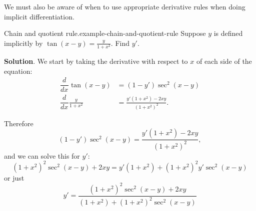 \documentclass[10pt,]{book}
\numberwithin{equation}{section}
\newcommand{\dv}[3][]{\dfrac{d^{#1} #2}{d #3^{#1}}}
\begin{document}
\hypertarget{p-163}{}%
We must also be aware of when to use appropriate derivative rules when doing implicit differentiation.%
\begin{example}{Chain and quotient rule.}{example-chain-and-quotient-rule}%
\hypertarget{p-164}{}%
Suppose \(y\) is defined implicitly by \(\tan(x-y) = \frac{y}{1+x^{2}}\). Find \(y'\).%
\par\smallskip%
\noindent\textbf{Solution}.\hypertarget{solution-35}{}\quad%
\hypertarget{p-165}{}%
We start by taking the derivative with respect to \(x\) of each side of the equation:%
\begin{align*}
\dv{}{x}\tan(x-y) & = (1-y')\sec^{2}(x-y) \\
\dv{}{x}\frac{y}{1+x^{2}} & = \frac{y'(1+x^{2}) - 2xy}{(1+x^{2})^{2}}. 
\end{align*}
%
\par
\hypertarget{p-166}{}%
Therefore%
\begin{equation*}
(1-y')\sec^{2}(x-y) = \frac{y'(1+x^{2}) - 2xy}{(1+x^{2})^{2}},
\end{equation*}
and we can solve this for \(y'\):%
\begin{equation*}
(1+x^{2})^{2}\sec^{2}(x-y) + 2xy = y'(1+x^{2}) + (1+x^{2})^{2}y'\sec^{2}(x-y)
\end{equation*}
or just%
\begin{equation*}
y' = \frac{(1+x^{2})^{2}\sec^{2}(x-y) + 2xy}{(1+x^{2})+(1+x^{2})^{2}\sec^{2}(x-y)}
\end{equation*}
%
\end{example}
\end{document}
